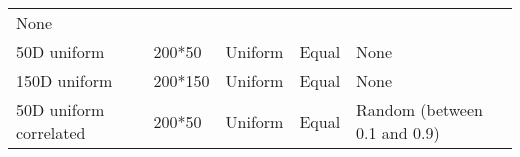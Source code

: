 \documentclass[]{article}
\begin{document}
\begin{longtable}[]{@{}lllll@{}}
\begin{minipage}[t]{0.13\columnwidth}
None\strut
\end{minipage}\tabularnewline
\begin{minipage}[t]{0.12\columnwidth}\raggedright\strut
50D uniform\strut
\end{minipage} & \begin{minipage}[t]{0.08\columnwidth}\raggedright\strut
200*50\strut
\end{minipage} & \begin{minipage}[t]{0.31\columnwidth}\raggedright\strut
Uniform\strut
\end{minipage} & \begin{minipage}[t]{0.21\columnwidth}\raggedright\strut
Equal\strut
\end{minipage} & \begin{minipage}[t]{0.13\columnwidth}\raggedright\strut
None\strut
\end{minipage}\tabularnewline
\begin{minipage}[t]{0.12\columnwidth}\raggedright\strut
150D uniform\strut
\end{minipage} & \begin{minipage}[t]{0.08\columnwidth}\raggedright\strut
200*150\strut
\end{minipage} & \begin{minipage}[t]{0.31\columnwidth}\raggedright\strut
Uniform\strut
\end{minipage} & \begin{minipage}[t]{0.21\columnwidth}\raggedright\strut
Equal\strut
\end{minipage} & \begin{minipage}[t]{0.13\columnwidth}\raggedright\strut
None\strut
\end{minipage}\tabularnewline
\begin{minipage}[t]{0.12\columnwidth}\raggedright\strut
50D uniform correlated\strut
\end{minipage} & \begin{minipage}[t]{0.08\columnwidth}\raggedright\strut
200*50\strut
\end{minipage} & \begin{minipage}[t]{0.31\columnwidth}\raggedright\strut
Uniform\strut
\end{minipage} & \begin{minipage}[t]{0.21\columnwidth}\raggedright\strut
Equal\strut
\end{minipage} & \begin{minipage}[t]{0.13\columnwidth}\raggedright\strut
Random (between 0.1 and 0.9)\strut
\end{minipage}\tabularnewline

\end{longtable}
\end{document}
